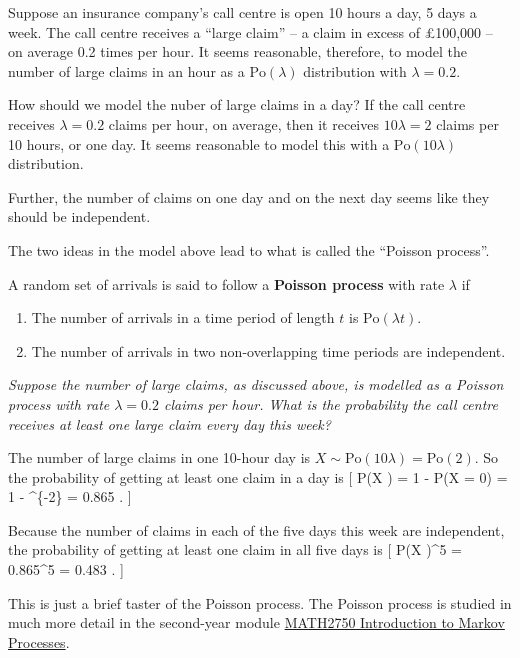 \documentclass[
  letterpaper,
  DIV=11,
  numbers=noendperiod]{scrreprt}
\providecommand{\tightlist}{%
  \setlength{\itemsep}{0pt}\setlength{\parskip}{0pt}}\usepackage{longtable,booktabs,array}
\theoremstyle{remark}
\begin{document}
Suppose an insurance company's call centre is open 10 hours a day, 5
days a week. The call centre receives a ``large claim'' -- a claim in
excess of £100,000 -- on average 0.2 times per hour. It seems
reasonable, therefore, to model the number of large claims in an hour as
a \(\mathrm{Po}(\lambda)\) distribution with \(\lambda = 0.2\).

How should we model the nuber of large claims in a day? If the call
centre receives \(\lambda = 0.2\) claims per hour, on average, then it
receives \(10\lambda = 2\) claims per 10 hours, or one day. It seems
reasonable to model this with a \(\mathrm{Po}(10\lambda)\) distribution.

Further, the number of claims on one day and on the next day seems like
they should be independent.

The two ideas in the model above lead to what is called the ``Poisson
process''.

A random set of arrivals is said to follow a \textbf{Poisson process}
with rate \(\lambda\) if

\begin{enumerate}
\def\labelenumi{\arabic{enumi}.}
\tightlist
\item
  The number of arrivals in a time period of length \(t\) is
  \(\mathrm{Po}(\lambda t)\).
\item
  The number of arrivals in two non-overlapping time periods are
  independent.
\end{enumerate}

\emph{Suppose the number of large claims, as discussed above, is
modelled as a Poisson process with rate \(\lambda = 0.2\) claims per
hour. What is the probability the call centre receives at least one
large claim every day this week?}

The number of large claims in one 10-hour day is
\(X \sim \mathrm{Po}(10\lambda) = \mathrm{Po}(2)\). So the probability
of getting at least one claim in a day is {[} \mathbb P(X ) = 1 -
\mathbb P(X = 0) = 1 - \^{}\{-2\} = 0.865 . {]}

Because the number of claims in each of the five days this week are
independent, the probability of getting at least one claim in all five
days is {[} \mathbb P(X )\^{}5 = 0.865\^{}5 = 0.483 . {]}

This is just a brief taster of the Poisson process. The Poisson process
is studied in much more detail in the second-year module
\href{https://mpaldridge.github.io/math2750/}{MATH2750 Introduction to
Markov Processes}.
\end{document}
